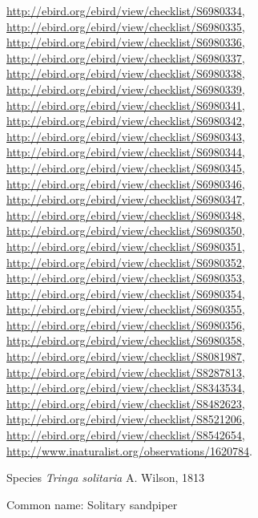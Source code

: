 \documentclass[9pt, article]{memoir}
\begin{document}
\begin{multicols}{2}
\url{http://ebird.org/ebird/view/checklist/S6980334}, 
\url{http://ebird.org/ebird/view/checklist/S6980335}, 
\url{http://ebird.org/ebird/view/checklist/S6980336}, 
\url{http://ebird.org/ebird/view/checklist/S6980337}, 
\url{http://ebird.org/ebird/view/checklist/S6980338}, 
\url{http://ebird.org/ebird/view/checklist/S6980339}, 
\url{http://ebird.org/ebird/view/checklist/S6980341}, 
\url{http://ebird.org/ebird/view/checklist/S6980342}, 
\url{http://ebird.org/ebird/view/checklist/S6980343}, 
\url{http://ebird.org/ebird/view/checklist/S6980344}, 
\url{http://ebird.org/ebird/view/checklist/S6980345}, 
\url{http://ebird.org/ebird/view/checklist/S6980346}, 
\url{http://ebird.org/ebird/view/checklist/S6980347}, 
\url{http://ebird.org/ebird/view/checklist/S6980348}, 
\url{http://ebird.org/ebird/view/checklist/S6980350}, 
\url{http://ebird.org/ebird/view/checklist/S6980351}, 
\url{http://ebird.org/ebird/view/checklist/S6980352}, 
\url{http://ebird.org/ebird/view/checklist/S6980353}, 
\url{http://ebird.org/ebird/view/checklist/S6980354}, 
\url{http://ebird.org/ebird/view/checklist/S6980355}, 
\url{http://ebird.org/ebird/view/checklist/S6980356}, 
\url{http://ebird.org/ebird/view/checklist/S6980358}, 
\url{http://ebird.org/ebird/view/checklist/S8081987}, 
\url{http://ebird.org/ebird/view/checklist/S8287813}, 
\url{http://ebird.org/ebird/view/checklist/S8343534}, 
\url{http://ebird.org/ebird/view/checklist/S8482623}, 
\url{http://ebird.org/ebird/view/checklist/S8521206}, 
\url{http://ebird.org/ebird/view/checklist/S8542654}, 
\url{http://www.inaturalist.org/observations/1620784}.

\vspace{6pt}\noindent\hspace{36pt}Species \textit{Tringa solitaria} A. Wilson, 1813


Common name: Solitary sandpiper


\end{multicols}
\end{document}
